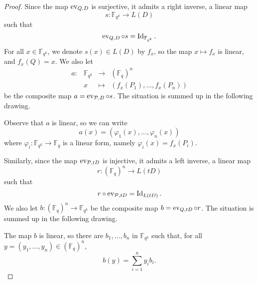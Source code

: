 \begin{proof}
  Since the map $\operatorname{ev}_{Q, D}$ is surjective, it admits a right inverse, \ie a linear
  map 
  \[
    s: \mathbb{F}_{q^k} \to L(D)
  \]
  such that
  \[
    \operatorname{ev}_{Q, D}\circ s = \operatorname{Id}_{\mathbb{F}_{q^k}}.
  \]
For all $x\in\mathbb{F}_{q^k}$, we denote $s(x)\in L(D)$ by $f_x$,
so the map $x\mapsto f_x$ is linear, and $f_x(Q)=x$. We
  also let
  \[
        \begin{array}{cccc}
          a: & \mathbb{F}_{q^k} & \to & (\mathbb{F}_{q})^n \\
          & x & \mapsto & (f_x(P_1), \dots, f_x(P_n))
\end{array}
  \]
  be the composite map $a = \operatorname{ev}_{\mathcal{P}, D}\circ s$. The situation is summed up in the
  following drawing.
   \begin{center}
  \end{center}
Observe that $a$ is linear, so we can write
\[ a(x) = (\varphi_1(x), \dots, \varphi_n(x)) \]
where $\varphi_i:\mathbb{F}_{q^k}\to\mathbb{F}_{q}$ is a linear form, namely $\varphi_i(x)=f_x(P_i)$.

  Similarly, since the map $\operatorname{ev}_{\mathcal{P}, tD}$ is injective, it admits a left inverse, \ie a linear
  map 
  \[
    r: (\mathbb{F}_{q})^n \to L(tD)
  \]
  such that 
  \[r\circ\operatorname{ev}_{\mathcal{P}, tD} = \operatorname{Id}_{L(tD)}.
  \]
We also let $b: (\mathbb{F}_{q})^n \to \mathbb{F}_{q^k}$
  be the composite map $b = \operatorname{ev}_{Q, tD}\circ r$.   The situation is summed up in the
  following drawing.
  \begin{center}
\end{center}
The map $b$ is linear, so there are $b_1, \dots, b_n$ in
  $\mathbb{F}_{q^k}$ such that, for all $y=(y_1, \dots, y_n)\in(\mathbb{F}_{q})^n$,
  \[
    b(y) = \sum_{i=1}^n y_i b_i.
  \]


\end{proof}
